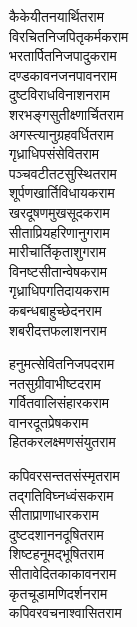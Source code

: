 \begin{large}
\begin{multicols}{2}
कैकेयीतनयार्थित\hfill राम\\
विरचितनिजपितृकर्मक\hfill राम\\
भरतार्पितनिजपादुक\hfill राम\\
\jaya
{}
दण्डकावनजनपावन\hfill राम\\
दुष्टविराधविनाशन\hfill राम\\
शरभङ्गसुतीक्ष्णार्चित\hfill राम\\
अगस्त्यानुग्रहवर्धित\hfill राम\\
गृध्राधिपसंसेवित\hfill राम\\
पञ्चवटीतटसुस्थित\hfill राम\\
शूर्पणखार्तिविधायक\hfill राम\\
खरदूषणमुखसूदक\hfill राम\\
सीताप्रियहरिणानुग\hfill राम\\
मारीचार्तिकृताशुग\hfill राम\\
विनष्टसीतान्वेषक\hfill राम\\
गृध्राधिपगतिदायक\hfill राम\\
कबन्धबाहुच्छेदन\hfill राम\\
शबरीदत्तफलाशन\hfill राम\\
\jaya

हनुमत्सेवितनिजपद\hfill राम\\
नतसुग्रीवाभीष्टद\hfill राम\\
गर्वितवालिसंहारक\hfill राम\\
वानरदूतप्रेषक\hfill राम\\
हितकरलक्ष्मणसंयुत\hfill राम\\
\jaya

कपिवरसन्ततसंस्मृत\hfill राम\\
तद्गतिविघ्नध्वंसक\hfill राम\\
सीताप्राणाधारक\hfill राम\\
दुष्टदशाननदूषित\hfill राम\\
शिष्टहनूमद्भूषित\hfill राम\\
सीतावेदितकाकावन\hfill राम\\
कृतचूडामणिदर्शन\hfill राम\\
कपिवरवचनाश्वासित\hfill राम\\
\jaya


\end{multicols}
\end{large}
